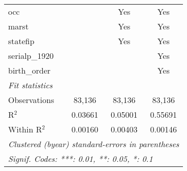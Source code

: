 \begin{tabular}{lccc}
   occ                           &                & Yes             & Yes\\  
   marst                         &                & Yes             & Yes\\  
   statefip                      &                & Yes             & Yes\\  
   serialp\_1920                 &                &                 & Yes\\  
   birth\_order                  &                &                 & Yes\\  
   \midrule
   \emph{Fit statistics}\\
   Observations                  & 83,136         & 83,136          & 83,136\\  
   R$^2$                         & 0.03661        & 0.05001         & 0.55691\\  
   Within R$^2$                  & 0.00160        & 0.00403         & 0.00146\\  
   \midrule \midrule
   \multicolumn{4}{l}{\emph{Clustered (byear) standard-errors in parentheses}}\\
   \multicolumn{4}{l}{\emph{Signif. Codes: ***: 0.01, **: 0.05, *: 0.1}}\\
\end{tabular}
\par\endgroup


